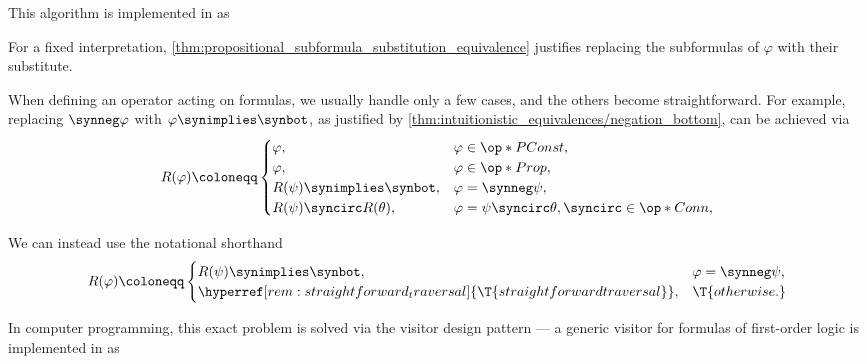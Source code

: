 \begin{comments}
  \item This algorithm is implemented in \cite{notebook:code} as
  \begin{CodeRefDisplay}
  \end{CodeRefDisplay}
\end{comments}
\begin{defproof}
  For a fixed interpretation, \cref{thm:propositional_subformula_substitution_equivalence} justifies replacing the subformulas of \( \varphi \) with their substitute.
\end{defproof}

\begin{remark}\label{rem:straightforward_traversal}
  When defining an operator acting on formulas, we usually handle only a few cases, and the others become straightforward. For example, replacing \( \synneg \varphi \) with \( \varphi \synimplies \synbot \), as justified by \cref{thm:intuitionistic_equivalences/negation_bottom}, can be achieved via
  \begin{equation*}
    \begin{aligned}
      R(\varphi) \coloneqq \begin{cases}
        \varphi,                     &\varphi \in \op*{PConst}, \\
        \varphi,                     &\varphi \in \op*{Prop}, \\
        R(\psi) \synimplies \synbot, &\varphi = \synneg \psi, \\
        R(\psi) \syncirc R(\theta),  &\varphi = \psi \syncirc \theta, {\syncirc} \in \op*{Conn}, \\
      \end{cases}
    \end{aligned}
  \end{equation*}

  We can instead use the notational shorthand
  \begin{equation*}
    \begin{aligned}
      R(\varphi) \coloneqq \begin{cases}
        R(\psi) \synimplies \synbot,                                             &\varphi = \synneg \psi, \\
        \hyperref[rem:straightforward_traversal]{\T{straightforward traversal}}, &\T{otherwise.}
      \end{cases}
    \end{aligned}
  \end{equation*}
\end{remark}
\begin{comments}
  \item In computer programming, this exact problem is solved via the visitor design pattern --- a generic visitor for formulas of first-order logic is implemented in \cite{notebook:code} as
  \begin{CodeRefDisplay}
  \end{CodeRefDisplay}
\end{comments}

